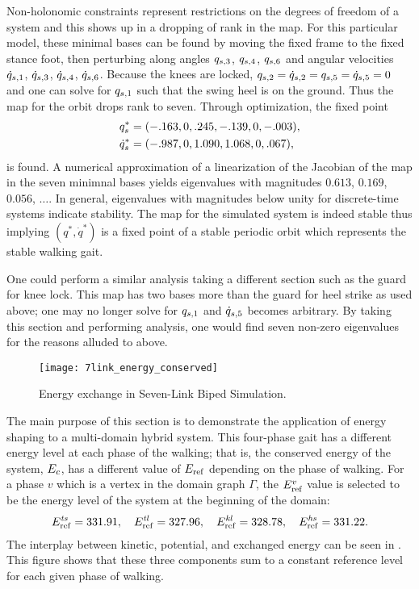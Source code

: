 Non-holonomic constraints represent restrictions on the degrees of freedom of a
system and this shows up in a dropping of rank in the \Poincare{} map.
%
For this particular model, these minimal bases can be found by moving the fixed
frame to the fixed stance foot, then perturbing along angles $q_{s,3}$,
$q_{s,4}$, $q_{s,6}$ and angular velocities $\dot{q}_{s,1}$, $\dot{q}_{s,3}$, $\dot{q}_{s,4}$,
$\dot{q}_{s,6}$.
%
Because the knees are locked, $q_{s,2} = \dot{q}_{s,2} = q_{s,5} = \dot{q}_{s,5} = 0$ and
one can solve for $q_{s,1}$ such that the swing heel is on the ground.
%
Thus the \Poincare{} map for the orbit drops rank to seven.
%
Through optimization, the fixed point
\begin{align*}
  q_{s}^{*} &= (-.163, 0, .245, -.139, 0, -.003),\\
  \dot{q}_{s}^{*} &= (-.987, 0, 1.090, 1.068, 0, .067),
\end{align*}
is found.
%
A numerical approximation of a linearization of the Jacobian of the \Poincare{}
map in the seven minimnal bases yields eigenvalues with magnitudes $0.613$,
$0.169$, $0.056$, $\ldots$.
%
In general, eigenvalues with magnitudes below unity for discrete-time systems
indicate stability.
%
The \Poincare{} map for the simulated system is indeed stable thus implying
$(q^*, \dot q^*)$ is a fixed point of a stable periodic orbit which represents
the stable walking gait.

One could perform a similar analysis taking a different \Poincare{} section such
as the guard for knee lock.
%
This map has two bases more than the guard for heel strike as used above;
%
one may no longer solve for $q_{s,1}$ and $\dot{q}_{s,5}$ becomes arbitrary.
%
By taking this \Poincare{} section and performing analysis, one would find seven
non-zero eigenvalues for the reasons alluded to above.

\begin{figure}[t!]
  \centering
  \texttt{[image: 7link\_energy\_conserved]}
  \caption[Energy exchange in Seven-Link Biped Simulation.]{Energy exchange in
    Seven-Link Biped Simulation.}
  \label{fig:7link_energy_conserved}
\end{figure}

The main purpose of this section is to demonstrate the application of energy
shaping to a multi-domain hybrid system.
%
This four-phase gait has a different energy level at each phase of the
walking; that is, the conserved energy of the system, $E_{c}$, has a different
value of $E_{\mathrm{ref}}$ depending on the phase of walking.
%
For a phase $v$ which is a vertex in the domain graph $\Gamma$, the $E_{\mathrm{ref}}^v$
value is selected to be the energy level of the system at the beginning of the
domain:
%
\begin{align*}
  E_{\mathrm{ref}}^{\mathit{ts}} = 331.91, \quad
  E_{\mathrm{ref}}^{\mathit{tl}} = 327.96, \quad
  E_{\mathrm{ref}}^{\mathit{kl}} = 328.78, \quad
  E_{\mathrm{ref}}^{\mathit{hs}} = 331.22.
\end{align*}
%
The interplay between kinetic, potential, and exchanged energy can be seen in
.
%
This figure shows that these three components sum to a constant reference level
for each given phase of walking.


